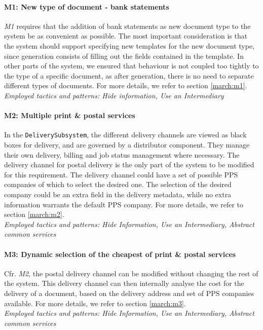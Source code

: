 \paragraph{M1: New type of document - bank statements} \emph{M1} requires that the addition of bank statements as new document type to the system be as convenient as possible. The most important consideration is that the system should support specifying new templates for the new document type, since generation consists of filling out the fields contained in the template. In other parts of the system, we ensured that behaviour is not coupled too tightly to the type of a specific document, as after generation, there is no need to separate different types of documents. For more details, we refer to section \ref{march:m1}.\\
\emph{Employed tactics and patterns: Hide information, Use an Intermediary}
    
\paragraph{M2: Multiple print \& postal services} 
In the \texttt{DeliverySubsystem}, the different delivery channels are viewed as black boxes for delivery, and are governed by a distributor component. They manage their own delivery, billing and job status management where necessary. The delivery channel for postal delivery is the only part of the system to be modified for this requirement. The delivery channel could have a set of possible PPS companies of which to select the desired one. The selection of the desired company could be an extra field in the delivery metadata, while no extra information warrants the default PPS company. For more details, we refer to section \ref{march:m2}.\\
\emph{Employed tactics and patterns: Hide Information, Use an Intermediary, Abstract common services}
    
\paragraph{M3: Dynamic selection of the cheapest of print \& postal services}
Cfr. \emph{M2}, the postal delivery channel can be modified without changing the rest of the system. This delivery channel can then internally analyse the cost for the delivery of a document, based on the delivery address and set of PPS companies available. For more details, we refer to section \ref{march:m3}.\\
\emph{Employed tactics and patterns: Hide Information, Use an Intermediary, Abstract common services}

